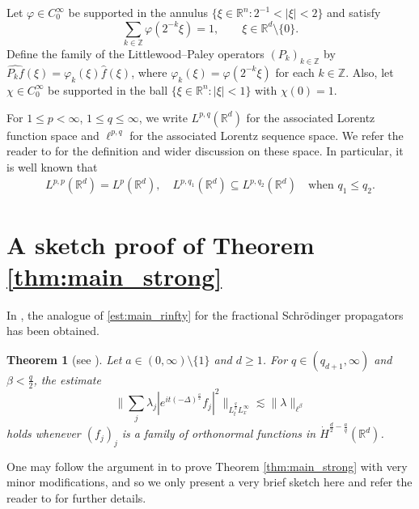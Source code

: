 \documentclass[a4paper]{amsart}
\numberwithin{equation}{section}%
\theoremstyle{plain}%
\newtheorem{theorem}{Theorem}[section]
\theoremstyle{definition}
\theoremstyle{remark}%
\newcommand{\R}{{\mathbb R}}
\newcommand{\Z}{{\mathbb Z}}
\begin{document}
Let $\varphi\in C_0^\infty$ be supported in the annulus $\{\xi\in\mathbb R^n:2^{-1}<|\xi|<2\}$ and satisfy
\[
\sum_{k \in \Z} \varphi(2^{-k} \xi) = 1, \qquad \xi \in \R^d \setminus \{0\}.
\]
Define the family of the Littlewood--Paley operators $(P_k)_{k \in \Z}$ by $\widehat{P_k f}(\xi)=\varphi_k(\xi)\widehat{f}(\xi)$, where $\varphi_k(\xi)=\varphi(2^{-k}\xi)$ for each $k\in \mathbb Z$. Also, let $\chi \in C_0^\infty$ be supported in the ball $\{\xi\in\mathbb R^n: |\xi|<1\}$ with $\chi(0) = 1$.

For $1 \leq p< \infty$, $1\leq q \leq \infty$, we write $L^{p,q}(\mathbb R^d)$ for the associated Lorentz function space and $\ell^{p,q}$ for the associated Lorentz sequence space. We refer the reader to \cite{Grafakos, SteinWeiss} for the definition and wider discussion on these space. In particular, it is well known that
\begin{align*}
    L^{p,p}(\R^d) = L^p(\R^d), \quad L^{p,q_1}(\R^d) \subseteq L^{p,q_2}(\R^d) \quad \text{when } q_1 \leq q_2.
\end{align*}


 
\section{A sketch proof of Theorem \ref{thm:main_strong}} \label{section:strongtype}
In \cite{BKS}, the analogue of \eqref{est:main_rinfty} for the fractional Schr\"odinger propagators has been obtained.
\begin{theorem}[see \cite{BKS}]\label{thm:main_BKS}
Let $a \in (0,\infty) \setminus \{1\}$ and $d \geq 1$. For $q \in (q_{d+1},\infty)$ and $\beta<\frac{q}{2}$, the estimate
\begin{equation}
\label{est:rinfty_Sch}
\bigg\| \sum_j \lambda_j |e^{it (-\Delta)^\frac a2} f_j|^2 \bigg\|_{L^{\frac{q}{2}}_tL^\infty_x} \lesssim \| \lambda \|_{\ell^\beta}
\end{equation}
holds whenever $(f_j)_j$ is a family of orthonormal functions in $\dot{H}^{\frac{d}{2} - \frac{a}{q}}(\mathbb{R}^d)$. 
\end{theorem}
One may follow the argument in \cite{BKS} to prove Theorem \ref{thm:main_strong} with very minor modifications, and so we only present a very brief sketch here and refer the reader to \cite{BKS} for further details.
\end{document}
